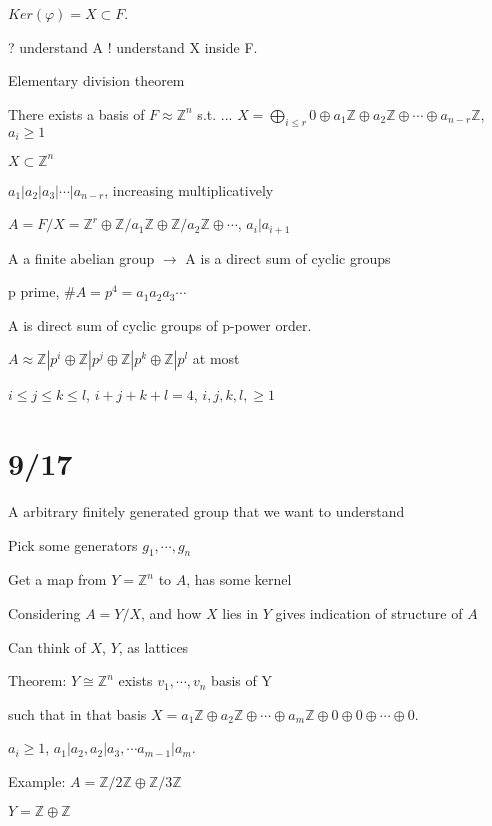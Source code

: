 \documentclass[12pt]{article}
\begin{document}
$Ker(\varphi) = X \subset F$.

? understand A ! understand X inside F.

\noindent
Elementary division theorem

There exists a basis of $F \approx \mathds{Z}^n$ s.t. ... $X = \bigoplus_{i \leq r}0 \oplus a_1\mathds{Z} \oplus a_2\mathds{Z} \oplus \cdots \oplus a_{n - r}\mathds{Z}$, $a_i \geq 1$

$X \subset \mathds{Z}^n$

$a_1 | a_2 | a_3 | \cdots | a_{n - r}$, increasing multiplicatively

$A = F/X = \mathds{Z}^r \oplus \mathds{Z}/a_1\mathds{Z} \oplus \mathds{Z}/a_2\mathds{Z} \oplus \cdots$, $a_i | a_{i + 1}$

A a finite abelian group $\to$ A is a direct sum of cyclic groups

\noindent
p prime, $\#A = p^4 = a_1a_2a_3\cdots$

A is direct sum of cyclic groups of p-power order.

$A \approx \mathds{Z}|p^i \oplus \mathds{Z}|p^j \oplus \mathds{Z}|p^k \oplus \mathds{Z}|p^l$ at most

$i \leq j \leq k \leq l$, $i + j + k + l = 4$, $i, j, k, l, \geq 1$

\section{9/17}

A arbitrary finitely generated group that we want to understand

Pick some generators $g_1, \cdots, g_n$

Get a map from $Y = \mathds{Z}^n$ to $A$, has some kernel

Considering $A = Y/X$, and how $X$ lies in $Y$ gives indication of structure of $A$

Can think of $X$, $Y$, as lattices

\noindent
Theorem: $Y \cong \mathds{Z}^n$ exists $v_1, \cdots, v_n$ basis of Y

such that in that basis $X = a_1\mathds{Z} \oplus a_2\mathds{Z} \oplus \cdots \oplus a_m\mathds{Z} \oplus 0 \oplus 0 \oplus \cdots \oplus 0.$

$a_i \geq 1$, $a_1 | a_2, a_2 | a_3, \cdots a_{m - 1}|a_m$.

\noindent
Example: $A = \mathds{Z}/2\mathds{Z} \oplus \mathds{Z}/3\mathds{Z}$

$Y = \mathds{Z} \oplus \mathds{Z}$
\end{document}
